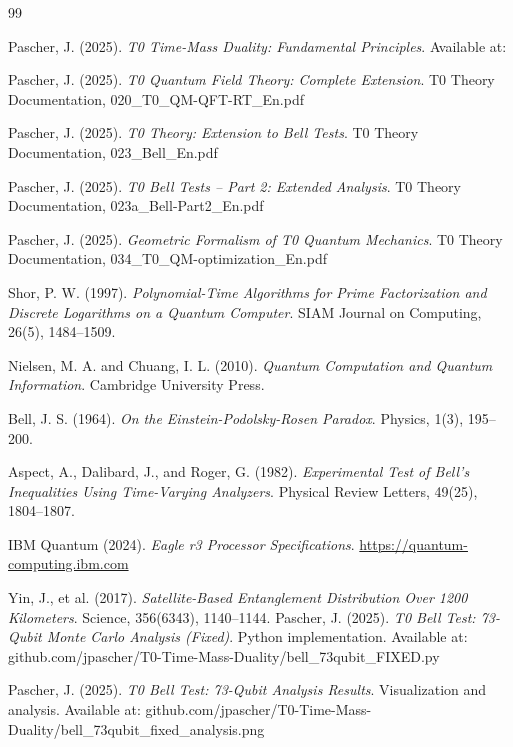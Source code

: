 \begin{thebibliography}{99}
	
	Pascher, J. (2025). 
	\textit{T0 Time-Mass Duality: Fundamental Principles}. 
	Available at: 
	
	Pascher, J. (2025). 
	\textit{T0 Quantum Field Theory: Complete Extension}. 
	T0 Theory Documentation, 020\_T0\_QM-QFT-RT\_En.pdf
	
	Pascher, J. (2025). 
	\textit{T0 Theory: Extension to Bell Tests}. 
	T0 Theory Documentation, 023\_Bell\_En.pdf
	
	Pascher, J. (2025). 
	\textit{T0 Bell Tests -- Part 2: Extended Analysis}. 
	T0 Theory Documentation, 023a\_Bell-Part2\_En.pdf
	
	Pascher, J. (2025). 
	\textit{Geometric Formalism of T0 Quantum Mechanics}. 
	T0 Theory Documentation, 034\_T0\_QM-optimization\_En.pdf
	
	Shor, P. W. (1997). 
	\textit{Polynomial-Time Algorithms for Prime Factorization and Discrete Logarithms on a Quantum Computer}. 
	SIAM Journal on Computing, 26(5), 1484--1509.
	
	Nielsen, M. A. and Chuang, I. L. (2010). 
	\textit{Quantum Computation and Quantum Information}. 
	Cambridge University Press.
	
	Bell, J. S. (1964). 
	\textit{On the Einstein-Podolsky-Rosen Paradox}. 
	Physics, 1(3), 195--200.
	
	Aspect, A., Dalibard, J., and Roger, G. (1982). 
	\textit{Experimental Test of Bell's Inequalities Using Time-Varying Analyzers}. 
	Physical Review Letters, 49(25), 1804--1807.
	
	IBM Quantum (2024). 
	\textit{Eagle r3 Processor Specifications}. 
	\url{https://quantum-computing.ibm.com}
	
	Yin, J., et al. (2017). 
	\textit{Satellite-Based Entanglement Distribution Over 1200 Kilometers}. 
	Science, 356(6343), 1140--1144.
	Pascher, J. (2025). 
	\textit{T0 Bell Test: 73-Qubit Monte Carlo Analysis (Fixed)}. 
	Python implementation. Available at: github.com/jpascher/T0-Time-Mass-Duality/bell\_73qubit\_FIXED.py
	
	Pascher, J. (2025). 
	\textit{T0 Bell Test: 73-Qubit Analysis Results}. 
	Visualization and analysis. Available at: github.com/jpascher/T0-Time-Mass-Duality/bell\_73qubit\_fixed\_analysis.png
	

\end{thebibliography}
